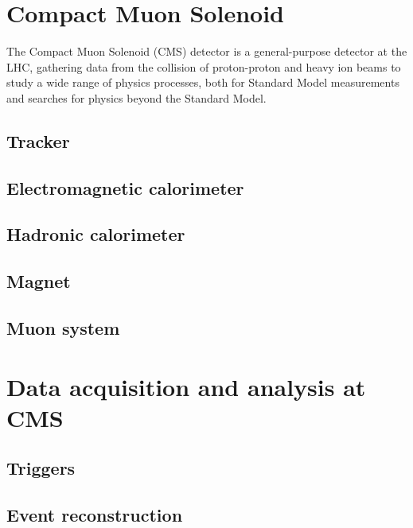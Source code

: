 \section{Compact Muon Solenoid\label{sec:cms}}

The Compact Muon Solenoid (CMS) detector is a general-purpose detector at the LHC, gathering data from the collision of proton-proton and heavy ion beams to study a wide range of physics processes, both for Standard Model measurements and searches for physics beyond the Standard Model.

\subsection{Tracker\label{sec:cmstracker}}

\subsection{Electromagnetic calorimeter\label{sec:cms-ecal}}

\subsection{Hadronic calorimeter\label{sec:cms-hcal}}

\subsection{Magnet\label{sec:cms-magnet}}

\subsection{Muon system\label{sec:cms-muon}}

\section{Data acquisition and analysis at CMS\label{sec:cms-daq}}

\subsection{Triggers\label{sec:cms-triggers}}

\subsection{Event reconstruction\label{sec:cms-reco}}